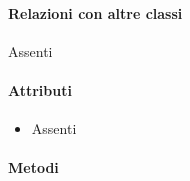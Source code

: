 \paragraph*{Relazioni con altre classi}
Assenti

\paragraph*{Attributi}
\begin{itemize}
\item[] Assenti
\end{itemize}

\paragraph*{Metodi}
